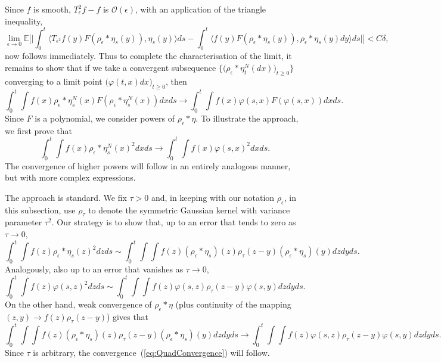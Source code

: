\documentclass[EJP]{ejpecp} %
\newcommand{\IE}{\mathbb E}
\begin{document}

Since $f$ is smooth, $T_\epsilon^2f-f$ is ${\mathcal O}(\epsilon)$, 
with an application of the triangle inequality, 
\[
\lim_{\epsilon\to 0}\IE\Big[\Big|\int_0^t\big\langle T_{\epsilon^2} f(y) 
F(\rho_\epsilon *\eta_s(y)), \eta_s(y) \big\rangle ds 
- \int_0^t\big\langle f(y) 
F(\rho_\epsilon * \eta_s(y)), \rho_\epsilon * \eta_s(y) dy 
\big\rangle ds\Big|\Big]
<C\delta,
\]
now follows immediately.
Thus to complete the characterisation of the limit, 
it remains to show that if we
take a convergent subsequence 
$\big\{\big(\rho_\epsilon*\eta_t^N(dx)\big)_{t\geq 0}\big\}$ 
converging to a limit point $\big(\varphi(t,x)dx\big)_{t\geq 0}$, then
\[ 
\int_0^t
\int f(x) \rho_\epsilon * \eta_s^N(x) F(\rho_\epsilon * \eta_s^N(x)) dx ds 
\rightarrow \int_0^t\int f(x) \varphi(s,x) F(\varphi(s,x)) dx ds. 
\]
Since $F$ is a polynomial, we consider powers of $\rho_\epsilon*\eta$.
To illustrate the approach, we first prove that
\begin{equation} 
\label{eq:QuadConvergence} 
\int_0^t\int f(x) 
\rho_\epsilon * \eta_s^N(x)^2 dx ds
\rightarrow \int_0^t \int f(x) 
\varphi(s,x)^2 dx ds. 
\end{equation}
The convergence of higher powers will follow in an entirely analogous manner, but
with more complex expressions.

The approach is standard. We fix $\tau>0$ and, in keeping with
our notation $\rho_\epsilon$, in this subsection, use $\rho_\tau$ to 
denote the symmetric Gaussian kernel with variance parameter $\tau^2$.
Our strategy is to show that, up to an error that tends
to zero as $\tau \to 0$, 
\begin{equation}
\label{approx2}
\int_0^t\int f(z) \rho_\epsilon*\eta_s(z)^2 dz ds
\sim 
\int_0^t\int \int f(z) (\rho_\epsilon * \eta_s)(z) 
\rho_\tau (z-y) (\rho_\epsilon * \eta_s)(y) dz dy ds.
\end{equation}
Analogously, also up to an error that vanishes as $\tau \to 0$,
\begin{equation}
\label{approx3}
\int_0^t\int f(z) \varphi(s,z)^2 dz ds
\sim 
\int_0^t\int \int f(z) \varphi(s,z) 
\rho_\tau (z-y) \varphi(s,y) dz dy ds.
\end{equation}
On the other hand,
weak convergence of $\rho_\epsilon * \eta$ 
(plus continuity of the mapping $(z,y) \rightarrow f(z) \rho_\tau(z-y)$) 
gives that 
\begin{equation}
\int_0^t\int \int f(z) (\rho_\epsilon * \eta_s)(z) 
\rho_\tau (z-y) (\rho_\epsilon * \eta_s)(y) dz dy ds
\to \int_0^t \int \int f(z) \varphi(s,z) 
\rho_\tau (z-y) \varphi(s,y) dz dy ds.
\end{equation}
Since $\tau$ is arbitrary, the 
convergence~(\ref{eq:QuadConvergence})
will follow.
\end{document}
